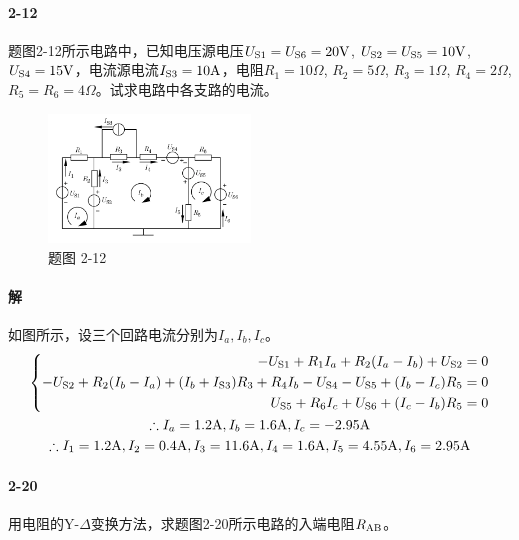 \documentclass[hyperref, UTF8]{ctexart}
\begin{document}
\paragraph{2-12}\label{2-12}
题图2-12所示电路中，已知电压源电压$U_{\rm S1}=U_{\rm S6}=20{\rm V}$, $U_{\rm S2}=U_{\rm S5}=10{\rm V}$, $U_{\rm S4}=15{\rm V}$，电流源电流$I_{\rm S3}=10{\rm A}$，电阻$R_1=10\Omega$, $R_2=5\Omega$, $R_3=1\Omega$, $R_4=2\Omega$, $R_5=R_6=4\Omega$。试求电路中各支路的电流。

\begin{figure}[!htb]
    \centering
    \includegraphics[width=0.479\textwidth]{p2-12.png}
    \caption*{题图 2-12}
\end{figure}

\paragraph{解}如图所示，设三个回路电流分别为$I_a, I_b, I_c$。
\begin{gather*}
    \left\{ \begin{aligned}
    -U_{\rm S1}+R_1I_a+R_2(I_a-I_b)+U_{\rm S2} &= 0 \\
    -U_{\rm S2}+R_2(I_b-I_a)+(I_b+I_{\rm S3})R_3+R_4I_b -U_{\rm S4}-U_{\rm S5}+(I_b-I_c)R_5 & = 0 \\
    U_{\rm S5}+R_6I_c+U_{\rm S6}+(I_c-I_b)R_5 & = 0
    \end{aligned}
    \right. \\
    \therefore I_a=1.2{\rm A}, I_b=1.6{\rm A}, I_c=-2.95{\rm A} \\
    \therefore I_1=1.2{\rm A}, I_2=0.4{\rm A}, I_3=11.6{\rm A}, I_4=1.6{\rm A}, I_5=4.55{\rm A}, I_6=2.95{\rm A}
\end{gather*}

\paragraph{2-20} \label{2-20}
用电阻的Y-$\Delta$变换方法，求题图2-20所示电路的入端电阻$R_{\rm AB}$。
\end{document}
